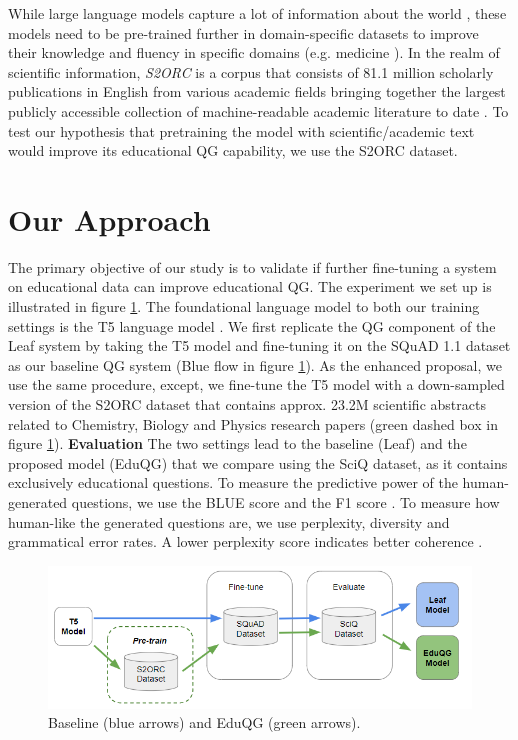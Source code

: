 \documentclass[letterpaper]{article} %
\begin{document}
While large language models capture a lot of information about the world \cite{raffel2020exploring}, these models need to be pre-trained further in domain-specific datasets to improve their knowledge and fluency in specific domains (e.g. medicine \cite{https://doi.org/10.48550/arxiv.2109.04588}). In the realm of scientific information, \emph{S2ORC} is a corpus that consists of 81.1 million scholarly publications in English from various academic fields bringing together the largest publicly accessible collection of machine-readable academic literature to date \cite{lo-etal-2020-s2orc}. To test our hypothesis that pretraining the model with scientific/academic text would improve its educational QG capability, we use the S2ORC dataset.

\section{Our Approach}

The primary objective of our study is to validate if further fine-tuning a system on educational data can improve educational QG. The experiment we set up is illustrated in figure \ref{fig:method}. The foundational language model to both our training settings is the T5 language model \cite{raffel2020exploring}. We first replicate the QG component of the Leaf system \cite{vachev2022leaf} by taking the T5 model and fine-tuning it on the SQuAD 1.1 dataset as our baseline QG system (Blue flow in figure \ref{fig:method}). As the enhanced proposal, we use the same procedure, except, we fine-tune the T5 model with a down-sampled version of the S2ORC dataset  that contains approx. {23.2M} scientific abstracts related to Chemistry, Biology and Physics research papers (green dashed box in figure \ref{fig:method}).  \textbf{Evaluation} The two settings lead to the baseline (Leaf) and the proposed model (EduQG) that we compare using the SciQ dataset, as it contains exclusively educational questions.
To measure the predictive power of the human-generated questions, we use the BLUE score and the F1 score \cite{DBLP:rajpurkar2016squad}. To measure how human-like the generated questions are, we use perplexity, diversity and grammatical error rates. A lower perplexity score indicates better coherence \cite{wang2022towards}.
\begin{figure}[]
\centering
\includegraphics[width=\columnwidth]{methodology_new_v2.png}
\caption{Baseline (blue arrows) and EduQG (green arrows).}
\label{fig:method}
\end{figure}
\end{document}
